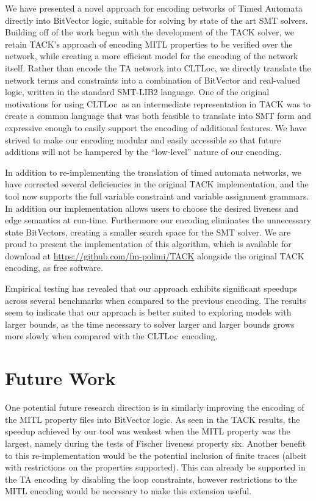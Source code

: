 \documentclass[a4paper,11pt]{report}
\theoremstyle{definition}
\newcommand{\cltloc}{CLTLoc}
\begin{document}
We have presented a novel approach for encoding networks of Timed Automata
directly into BitVector logic, suitable for solving by state of the art SMT
solvers. Building off of the work begun with the development of the TACK solver,
we retain TACK's approach of encoding MITL properties to be verified over the
network, while creating a more efficient model for the encoding of the network
itself. Rather than encode the TA network into \cltloc, we directly translate
the network terms and constraints into a combination of BitVector and
real-valued logic, written in the standard SMT-LIB2 language. One of the
original motivations for using \cltloc\ as an intermediate representation in
TACK was to create a common language that was both feasible to translate into
SMT form and expressive enough to easily support the encoding of additional
features. We have strived to make our encoding modular and easily accessible so
that future additions will not be hampered by the ``low-level'' nature of our
encoding.

In addition to re-implementing the translation of timed automata networks, we
have corrected several deficiencies in the original TACK implementation, and
the tool now supports the full variable constraint and variable assignment
grammars. In addition our implementation allows users to choose the desired
liveness and edge semantics at run-time. Furthermore our encoding eliminates the
unnecessary state BitVectors, creating a smaller search space for the SMT
solver. We are proud to present the implementation of this algorithm, which is
available for download at \url{https://github.com/fm-polimi/TACK} alongside the
original TACK encoding, as free software.

Empirical testing has revealed that our approach exhibits significant speedups
across several benchmarks when compared to the previous encoding. The results
seem to indicate that our approach is better suited to exploring models with
larger bounds, as the time necessary to solver larger and larger bounds grows
more slowly when compared with the \cltloc\ encoding.

\section{Future Work}

One potential future research direction is in similarly improving the encoding
of the MITL property files into BitVector logic. As seen in the TACK results,
the speedup achieved by our tool was weakest when the MITL property was the
largest, namely during the tests of Fischer liveness property six. Another
benefit to this re-implementation would be the potential inclusion of finite
traces (albeit with restrictions on the properties supported). This can already
be supported in the TA encoding by disabling the loop constraints, however
restrictions to the MITL encoding would be necessary to make this extension useful.
\end{document}
